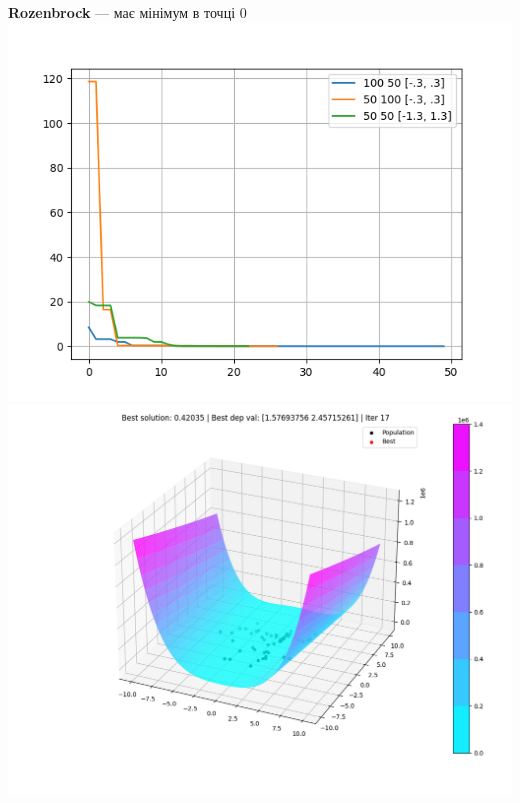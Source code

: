 \documentclass{article}
\begin{document}
        \newpage
        \textbf{Rozenbrock} --- має мінімум в точці 0
            \newline
            \includegraphics[scale=0.7]{Rozenbrock_dif.png}
            \newline
            \includegraphics[scale=0.7]{Rozenbrock.jpg}
            \newline
\end{document}
